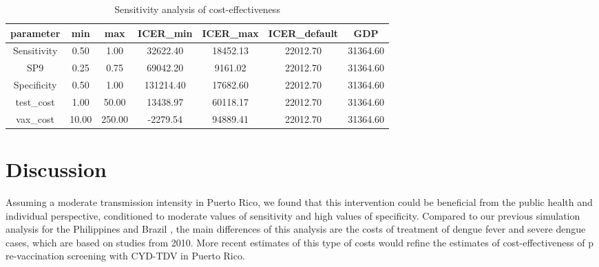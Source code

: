 \documentclass[12pt]{article}
\begin{document}
\begin{table}[ht]
\centering
\begin{tabular}{|c|c|c|c|c|c|c|}
  \hline
parameter & min & max & ICER\_min & ICER\_max & ICER\_default & GDP \\ 
  \hline
Sensitivity & 0.50 & 1.00 & 32622.40 & 18452.13 & 22012.70 & 31364.60 \\ 
  SP9 & 0.25 & 0.75 & 69042.20 & 9161.02 & 22012.70 & 31364.60 \\ 
  Specificity & 0.50 & 1.00 & 131214.40 & 17682.60 & 22012.70 & 31364.60 \\ 
  test\_cost & 1.00 & 50.00 & 13438.97 & 60118.17 & 22012.70 & 31364.60 \\ 
  vax\_cost & 10.00 & 250.00 & -2279.54 & 94889.41 & 22012.70 & 31364.60 \\ 
   \hline
\end{tabular}
\caption{Sensitivity analysis of cost-effectiveness} 
\label{table-tornado}
\end{table}


\section{Discussion}
Assuming a moderate transmission intensity in Puerto Rico, we found that this intervention could be beneficial from the public health and individual perspective, conditioned to moderate values of sensitivity and high values of specificity. Compared to our previous simulation analysis for the Philippines and Brazil \cite{Espana2019Biorxiv}, the main differences of this analysis are the costs of treatment of dengue fever and severe dengue cases, which are based on studies from 2010. More recent estimates of this type of costs would refine the estimates of cost-effectiveness of p re-vaccination screening with CYD-TDV in Puerto Rico. 

 
 
\end{document}
